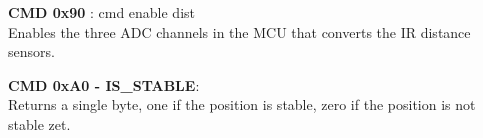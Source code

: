 \begin{itemize}
	\begin{item}
		\textbf{CMD 0x90 }: cmd enable dist\\ Enables the three ADC channels in the MCU that converts the IR distance sensors.
	\end{item}			

	\begin{item}
		\textbf{ CMD 0xA0 - IS\_STABLE}: \\ Returns a single byte, one if the position is stable, zero if the position is not stable zet.
	\end{item}		

\end{itemize}